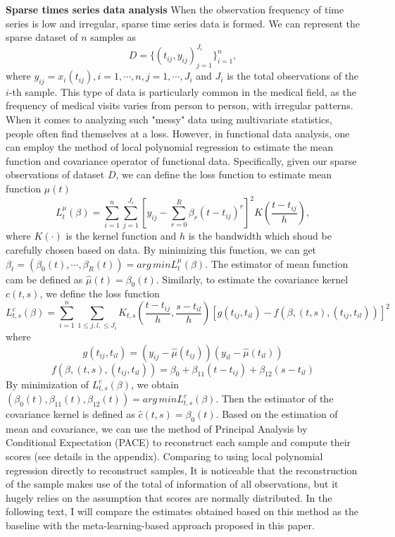 \documentclass{article}
\begin{document}
\textbf{Sparse times series data analysis}
When the observation frequency of time series is low and irregular, sparse time series data is formed. 
We can represent the sparse dataset of $n$ samples as 
$$D=\{(t_{ij},y_{ij})_{j=1}^{J_i}\}_{i=1}^n,$$ 
where
$y_{ij}=x_i(t_{ij}) , i=1, \cdots, n, j=1, \cdots, J_i$ and $J_i$ is the total observations of the $i$-th sample.
This type of data is particularly common in the medical field, as the frequency of medical visits varies from person to person, with irregular patterns.
When it comes to analyzing such "messy" data using multivariate statistics, people often find themselves at a loss.
However, in functional data analysis, one can employ the method of local polynomial regression to estimate the mean function and covariance operator of functional data.
Specifically, given our sparse observations of dataset $D$,
we can define the loss function to estimate mean function $\mu(t)$
$$
L_t^\mu(\beta)=\sum_{i=1}^n\sum_{j=1}^{J_i}\left[y_{ij}-\sum_{r=0}^R \beta_r\left(t-t_{ij}\right)^r\right]^2 K\left(\frac{t-t_{ij}}{h}\right),
$$
where $K(\cdot)$ is the kernel function and $h$ is the bandwidth which shoud be carefully chosen based on data.
By minimizing this function, we can get
$\beta_t=(\beta_0(t), \cdots, \beta_R(t))=arg\,min L_t^\mu(\beta)$. The estimator of mean function cam be defined as $\hat{\mu}(t)=\beta_0(t)$.
Similarly, to estimate the covariance kernel $c(t,s)$, we define the loss function 
$$
L^c_{t,s}(\beta)=\sum_{i=1}^n \sum_{1\leq j, l, \leq J_i} K_{t,s}(\frac{t-t_{ij}}{h}, \frac{s-t_{il}}{h}) \left[ g(t_{ij},t_{il})-f\left(\beta,(t,s),(t_{ij},t_{il})\right) \right]^2
$$
where
$$
g(t_{ij},t_{il})=(y_{ij}-\hat{\mu}(t_{ij}))(y_{il}-\hat{\mu}(t_{il}))
$$
$$
f\left(\beta,(t,s),(t_{ij},t_{il})\right)=\beta_0 + \beta_{11}(t-t_{ij})+\beta_{12}(s-t_{il})
$$
By minimization of $L_{t,s}^c(\beta)$, we obtain $(\beta_0(t),\beta_{11}(t),\beta_{12}(t))=arg\,min L_{t,s}^c(\beta)$. Then the estimator of the covariance kernel is defined as $\hat{c}(t,s)=\beta_0(t)$.
Based on the estimation of mean and covariance,  we can use the method of Principal Analysis by Conditional Expectation (PACE) to reconstruct each sample and compute their scores (see details in the appendix).
Comparing to using local polynomial regression directly to reconstruct samples, It is noticeable that the reconstruction of the sample makes use of the total of information of all observations, but it hugely relies on the assumption that scores are normally distributed. 
In the following text, I will compare the estimates obtained based on this method as the baseline with the meta-learning-based approach proposed in this paper.
\end{document}
